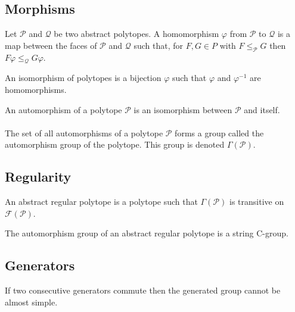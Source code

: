 \subsection{Morphisms}

\begin{definition}
  Let $\mathcal P$ and $\mathcal Q$ be two abstract polytopes. A homomorphism $\varphi$ from $\mathcal P$ to $\mathcal Q$ is a map between the faces of $\mathcal P$ and $\mathcal Q$ such that, for $F, G \in P$ with $F \le_{\mathcal P} G$ then $F\varphi \le_{\mathcal Q} G\varphi$.
\end{definition}

\begin{definition}
  An isomorphism of polytopes is a bijection $\varphi$ such that $\varphi$ and $\varphi^{-1}$ are homomorphisms.
\end{definition}

\begin{definition}
  An automorphism of a polytope $\mathcal P$ is an isomorphism between $\mathcal P$ and itself.
\end{definition}

\paragraph{}
The set of all automorphisms of a polytope $\mathcal P$ forms a group called the automorphism group of the polytope. This group is denoted $\Gamma(\mathcal P)$.

\subsection{Regularity}

\begin{definition}
  An abstract regular polytope is a polytope such that $\Gamma(\mathcal P)$ is transitive on $\mathcal F(\mathcal P)$.
\end{definition}

\begin{theorem}
  The automorphism group of an abstract regular polytope is a string C-group.
\end{theorem}

\subsection{Generators}

\begin{proposition}
  \label{adjacent-must-not-commute}
  If two consecutive generators commute then the generated group cannot be almost simple.
\end{proposition}
